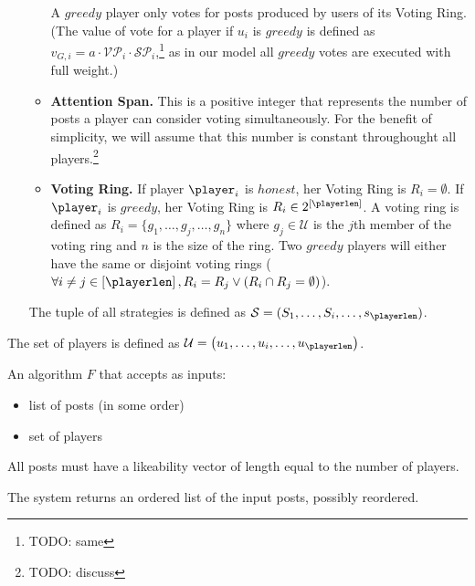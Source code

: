 \begin{definition}[Player]
\begin{itemize}
\begin{itemize}
          A $greedy$ player only votes for posts produced by users of its Voting
          Ring. (The value of vote for a player if $u_i$ is $greedy$ is defined
          as $v_{G,i} = a \cdot \mathcal{VP}_i \cdot
          \mathcal{SP}_i$,\footnote{TODO: same} as in our model all $greedy$
          votes are executed with full weight.)

          \item \textbf{Attention Span.} This is a positive integer that
          represents the number of posts a player can consider voting
          simultaneously. For the benefit of simplicity, we will assume that this
          number is constant throughought all players.\footnote{TODO: discuss}

          \item \textbf{Voting Ring.}  If player $\player_i$ is $honest$, her
          Voting Ring is $R_i = \emptyset$. If $\player_i$ is $greedy$, her
          Voting Ring is $R_i \in 2^{\left[\playerlen\right]}$. A voting ring is
          defined as $R_i = \lbrace g_1, \dots, g_j, \dots, g_n \rbrace$ where
          $g_j \in \mathcal{U}$ is the $j$th member of the voting ring and $n$
          is the size of the ring. Two $greedy$ players will either have the
          same or disjoint voting rings ($\forall i \neq j \in
          \left[\playerlen\right], R_i = R_j \vee \left(R_i \cap R_j =
          \emptyset\right)$).
        \end{itemize}
        The tuple of all strategies is defined as $\mathcal{S} = (S_1, \dots,
        S_i, \dots, s_\playerlen)$.
      \end{itemize}
      The set of players is defined as $\mathcal{U} = \left(u_1, \dots, u_i,
      \dots, u_\playerlen\right)$.
    \end{definition}

    \begin{definition}
      An algorithm $F$ that accepts as inputs:
      \begin{itemize}
        \item list of posts (in some order)
        \item set of players
      \end{itemize}
      All posts must have a likeability vector of length equal to the number of
      players.

      The system returns an ordered list of the input posts, possibly reordered.
    \end{definition}

